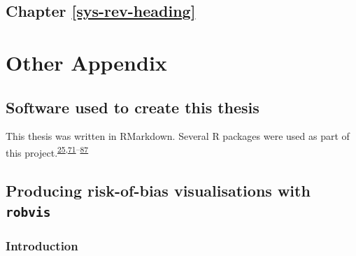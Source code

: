 \documentclass[a4paper, twoside]{templates/ociamthesis}
\begin{document}
\hypertarget{appendix-sys-rev}{%
\section{Chapter \ref{sys-rev-heading}}\label{appendix-sys-rev}}

\hypertarget{other-appendix-heading}{%
\chapter{Other Appendix}\label{other-appendix-heading}}

\hypertarget{software-used-to-create-this-thesis}{%
\section{Software used to create this thesis}\label{software-used-to-create-this-thesis}}

This thesis was written in RMarkdown. Several R packages were used as part of this project.\textsuperscript{\protect\hyperlink{ref-rbiorxiv}{25},\protect\hyperlink{ref-base}{71}--\protect\hyperlink{ref-xfun}{87}}

\hypertarget{appendix-robvis}{%
\section{\texorpdfstring{Producing risk-of-bias visualisations with \texttt{robvis}}{Producing risk-of-bias visualisations with robvis}}\label{appendix-robvis}}

\hypertarget{introduction-2}{%
\subsection{Introduction}\label{introduction-2}}
\end{document}
